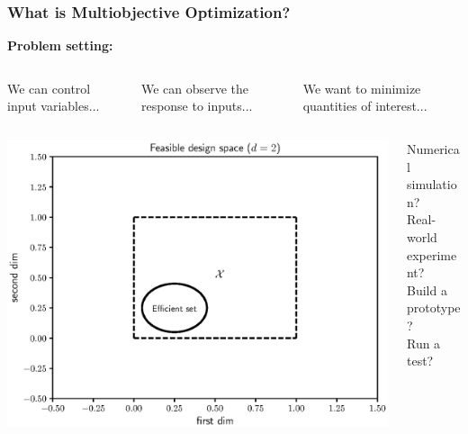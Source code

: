 \documentclass[aspectratio=169]{beamer}
\begin{document}
\begin{frame}\frametitle{What is Multiobjective Optimization?}
{\bf Problem setting:}\\
\medskip
\begin{columns}
\begin{column}{.3\textwidth}
We can control input variables...
\end{column}
\begin{column}{.25\textwidth}
We can observe the response to inputs...
\end{column}
\begin{column}{.3\textwidth}
We want to minimize quantities of interest...
\end{column}
\end{columns}
\begin{columns}
\begin{column}{.35\textwidth}
\includegraphics[width=\textwidth]{../img/moo_old/feasible_design.eps}
\end{column}
\begin{column}{.2\textwidth}
\begin{center}
{\scriptsize
Numerical simulation?\\
Real-world experiment?\\
Build a prototype?\\
Run a test?\\
}
\end{center}
\end{column}
\end{columns}
\end{frame}
\end{document}
